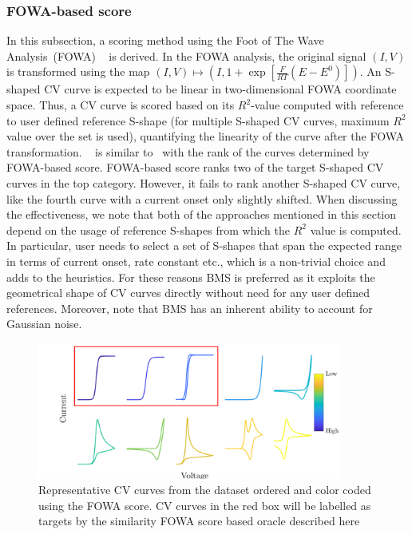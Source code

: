 \subsubsection{FOWA-based score} 
In this subsection, a scoring method using the Foot of The Wave Analysis~(FOWA) ~\cite{costentin2015cyclic} is derived.
In the FOWA analysis, the original signal \((I,V)\) is transformed using the map \((I,V)\mapsto(I,1+\exp[\frac{F}{RT}(E-E^0)])\). 
An S-shaped CV curve is expected to be linear in two-dimensional FOWA coordinate space. 
Thus, a CV curve is scored based on its \(R^2\)-value computed with reference to user defined reference S-shape (for multiple S-shaped CV curves, maximum \(R^2\) value over the set is used), quantifying the linearity of the curve after the FOWA transformation.
~ is similar to~ with the rank of the curves determined by FOWA-based score. 
FOWA-based score ranks two of the target S-shaped CV curves in the top category. 
However, it fails to rank another S-shaped CV curve, like the fourth curve with a current onset only slightly shifted.
When discussing the effectiveness, we note that both of the approaches mentioned in this section depend on the usage of reference S-shapes from which the \(R^2\) value is computed. 
In particular, user needs to select a set of S-shapes that span the expected range in terms of current onset, rate constant etc., which is a non-trivial choice and adds to the heuristics. 
For these reasons BMS is preferred as it exploits the geometrical shape of CV curves directly without need for any user defined references. 
Moreover, note that BMS has an inherent ability to account for Gaussian noise. 
\begin{figure}[h]
    \centering
    \includegraphics[width=100mm]{Chapter-3/figures/repfowaspectrum.png}
    \caption{Representative CV curves from the dataset ordered and color coded using the FOWA score. CV curves in the red box will be labelled as targets by the similarity FOWA score based oracle described here}
    \label{figSI:repfowascores}
\end{figure}

